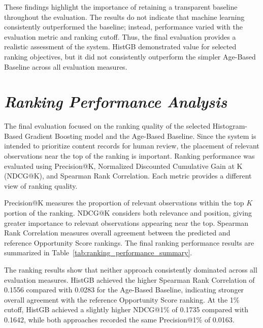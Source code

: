 \documentclass[12pt,a4paper]{report}
\begin{document}
These findings highlight the importance of retaining a transparent baseline throughout the evaluation. The results do not indicate that machine learning consistently outperformed the baseline; instead, performance varied with the evaluation metric and ranking cutoff. Thus, the final evaluation provides a realistic assessment of the system. HistGB demonstrated value for selected ranking objectives, but it did not consistently outperform the simpler Age-Based Baseline across all evaluation measures.

\section{\textit{Ranking Performance Analysis}}

The final evaluation focused on the ranking quality of the selected Histogram-Based Gradient Boosting model and the Age-Based Baseline. Since the system is intended to prioritize content records for human review, the placement of relevant observations near the top of the ranking is important. Ranking performance was evaluated using Precision@K, Normalized Discounted Cumulative Gain at K (NDCG@K), and Spearman Rank Correlation. Each metric provides a different view of ranking quality.

Precision@K measures the proportion of relevant observations within the top $K$ portion of the ranking. NDCG@K considers both relevance and position, giving greater importance to relevant observations appearing near the top. Spearman Rank Correlation measures overall agreement between the predicted and reference Opportunity Score rankings. The final ranking performance results are summarized in Table~\ref{tab:ranking_performance_summary}.

\begin{table}[htbp]
\centering
\caption{Final Ranking Performance on the Test Dataset}
\label{tab:ranking_performance_summary}
\end{table}
The ranking results show that neither approach consistently dominated across all evaluation measures. HistGB achieved the higher Spearman Rank Correlation of 0.1556 compared with 0.0283 for the Age-Based Baseline, indicating stronger overall agreement with the reference Opportunity Score ranking. At the 1\% cutoff, HistGB achieved a slightly higher NDCG@1\% of 0.1735 compared with 0.1642, while both approaches recorded the same Precision@1\% of 0.0163.
\end{document}
